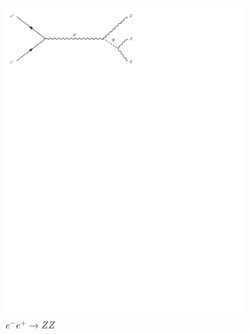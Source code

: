 \begin{figure}[h]
\begin{subfigure}[b]{0.3\textwidth}
    \includegraphics[trim={0.5cm 22cm 10cm 0cm},width=\textwidth]{../Diagrams/D11.pdf}
    \caption{$e^-e^+\rightarrow ZZ$}
    \label{fey:11}
  \end{subfigure}%
  ~
  \begin{subfigure}[b]{0.3\textwidth}

\end{subfigure}
\end{figure}
